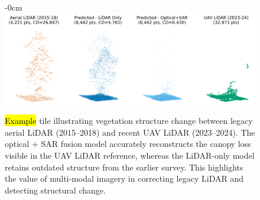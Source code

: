 \documentclass[remotesensing,article,accept,pdftex,moreauthors]{Definitions/mdpi}
\begin{document}
\begin{figure}[H]
\begin{adjustwidth}{-\extralength}{0cm}
    \centering
    \includegraphics[width=0.85\linewidth]{figures/single_veg_loss_example.png}
    \end{adjustwidth}
    \caption{\hl{Example} %
 tile illustrating vegetation structure change between legacy aerial LiDAR (\mbox{2015--2018}) and recent UAV LiDAR (2023--2024). The optical + SAR fusion model accurately reconstructs the canopy loss visible in the UAV LiDAR reference, whereas the LiDAR-only model retains outdated structure from the earlier survey. This highlights the value of multi-modal imagery in correcting legacy LiDAR and detecting structural change.}
    \label{fig:single_veg_loss_example}
\end{figure}


\vspace{-11pt}
\end{document}
